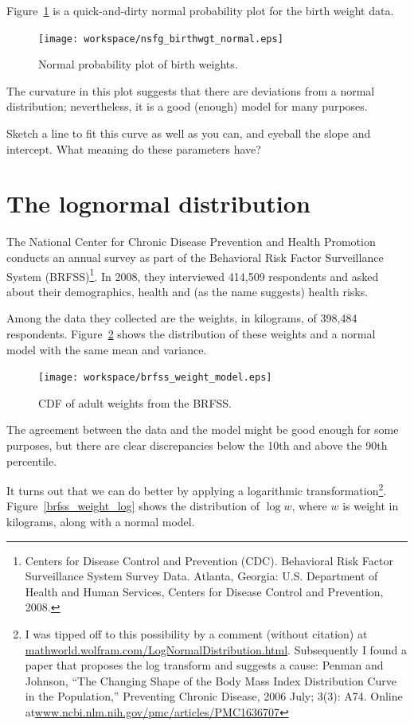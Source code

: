 \documentclass[12pt]{book}
\begin{document}
Figure~\ref{nsfg_birthwgt_normal} is a quick-and-dirty normal
probability plot for the birth weight data.

\begin{figure}
\centerline{\texttt{[image: workspace/nsfg\_birthwgt\_normal.eps]}}
\caption{Normal probability plot of birth weights.}
\label{nsfg_birthwgt_normal}
\end{figure}

The curvature in this plot suggests that there are
deviations from a normal distribution; nevertheless, it is a
good (enough) model for many purposes.

\begin{ex}
Sketch a line to fit this curve as well as you can, and
eyeball the slope and intercept.  What meaning do these parameters have?
\end{ex}


\section{The lognormal distribution}
\label{lognormal}

The National Center for Chronic Disease Prevention and Health
Promotion conducts an annual survey as part of the Behavioral Risk
Factor Surveillance System (BRFSS)\footnote{Centers for Disease
  Control and Prevention (CDC). Behavioral Risk Factor Surveillance
  System Survey Data. Atlanta, Georgia: U.S. Department of Health and
  Human Services, Centers for Disease Control and Prevention, 2008.}.
In 2008, they interviewed 414,509 respondents and asked about their
demographics, health and (as the name suggests) health risks.

Among the data they collected are the weights, in kilograms, of
398,484 respondents.  Figure~\ref{brfss_weight_model} shows the
distribution of these weights and a normal model with the same mean
and variance.

\begin{figure}
\centerline{\texttt{[image: workspace/brfss\_weight\_model.eps]}}
\caption{CDF of adult weights from the BRFSS.}
\label{brfss_weight_model}
\end{figure}

The agreement between the data and the model might be good enough
for some purposes, but there are clear discrepancies below the 10th
and above the 90th percentile.

It turns out that we can do better by applying a logarithmic
transformation\footnote{I was tipped off to this possibility by a
  comment (without citation) at
  \url{mathworld.wolfram.com/LogNormalDistribution.html}.
  Subsequently I found a paper that proposes the log transform and
  suggests a cause: Penman and Johnson, ``The Changing Shape of the
  Body Mass Index Distribution Curve in the Population,'' Preventing
  Chronic Disease, 2006 July; 3(3): A74.  Online
  at\url{www.ncbi.nlm.nih.gov/pmc/articles/PMC1636707}}.
Figure~\ref{brfss_weight_log} shows the distribution
of $\log w$, where $w$ is weight in kilograms, along with a normal
model.
\end{document}
